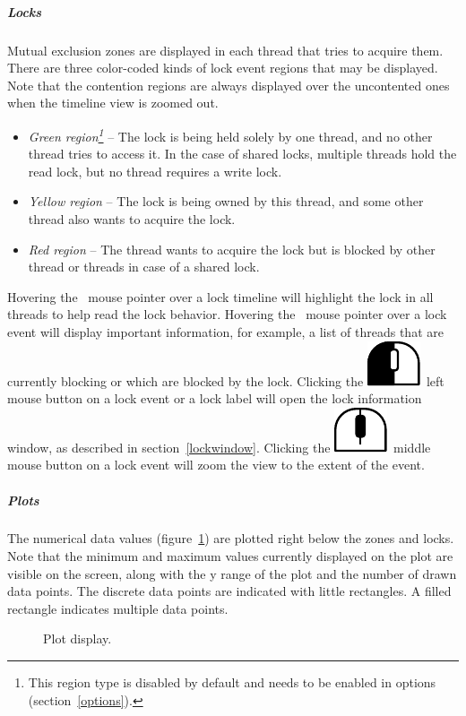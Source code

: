 \documentclass[hidelinks,titlepage,a4paper]{article}
\newcommand{\LMB}{\includegraphics[height=.8\baselineskip]{icons/lmb}}
\newcommand{\MMB}{\includegraphics[height=.8\baselineskip]{icons/mmb}}
\begin{document}
\subparagraph{Locks}

Mutual exclusion zones are displayed in each thread that tries to acquire them. There are three color-coded kinds of lock event regions that may be displayed. Note that the contention regions are always displayed over the uncontented ones when the timeline view is zoomed out.

\begin{itemize}
\item \emph{Green region\footnote{This region type is disabled by default and needs to be enabled in options (section~\ref{options}).}} -- The lock is being held solely by one thread, and no other thread tries to access it. In the case of shared locks, multiple threads hold the read lock, but no thread requires a write lock.
\item \emph{Yellow region} -- The lock is being owned by this thread, and some other thread also wants to acquire the lock.
\item \emph{Red region} -- The thread wants to acquire the lock but is blocked by other thread or threads in case of a shared lock.
\end{itemize}

Hovering the \faMousePointer{}~mouse pointer over a lock timeline will highlight the lock in all threads to help read the lock behavior. Hovering the \faMousePointer{}~mouse pointer over a lock event will display important information, for example, a list of threads that are currently blocking or which are blocked by the lock. Clicking the \LMB{}~left mouse button on a lock event or a lock label will open the lock information window, as described in section~\ref{lockwindow}. Clicking the \MMB{}~middle mouse button on a lock event will zoom the view to the extent of the event.

\subparagraph{Plots}
\label{plots}

The numerical data values (figure~\ref{plot}) are plotted right below the zones and locks. Note that the minimum and maximum values currently displayed on the plot are visible on the screen, along with the y range of the plot and the number of drawn data points. The discrete data points are indicated with little rectangles. A filled rectangle indicates multiple data points.

\begin{figure}[h]
\centering{}
\caption{Plot display.}
\label{plot}
\end{figure}
\end{document}
